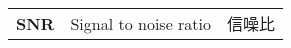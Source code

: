 ﻿%
\begin{terminology}
    \begin{longtable}{lll}

        \bf{SNR}         &	Signal to noise ratio                            &	信噪比	    \\


    \end{longtable}
\end{terminology}
